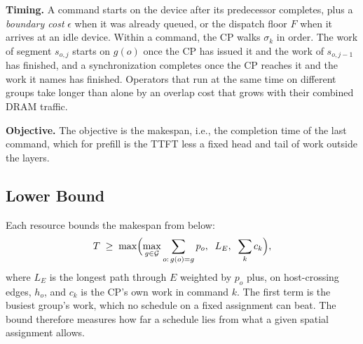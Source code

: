 \textbf{Timing.}
A command starts on the device after its predecessor completes, plus a \emph{boundary cost} $\epsilon$ when it was already queued, or the dispatch floor $F$ when it arrives at an idle device.
Within a command, the CP walks $\sigma_k$ in order.
The work of segment $s_{o,j}$ starts on $g(o)$ once the CP has issued it and the work of $s_{o,j-1}$ has finished, and a synchronization completes once the CP reaches it and the work it names has finished.
Operators that run at the same time on different groups take longer than alone by an overlap cost that grows with their combined DRAM traffic.

\textbf{Objective.}
The objective is the makespan, i.e., the completion time of the last command, which for prefill is the TTFT less a fixed head and tail of work outside the layers.

\subsection{Lower Bound}
\label{subsec:bound}

Each resource bounds the makespan from below:
\begin{equation}
\label{eq:lb}
T \;\ge\; \max\Bigl(\max_{g \in \mathcal{G}} \sum_{o:\,g(o)=g} p_o,\;\; L_E,\;\; \sum_{k} c_k\Bigr),
\end{equation}
where $L_E$ is the longest path through $E$ weighted by $p_o$ plus, on host-crossing edges, $h_o$, and $c_k$ is the CP's own work in command $k$.
The first term is the busiest group's work, which no schedule on a fixed assignment can beat.
The bound therefore measures how far a schedule lies from what a given spatial assignment allows.
